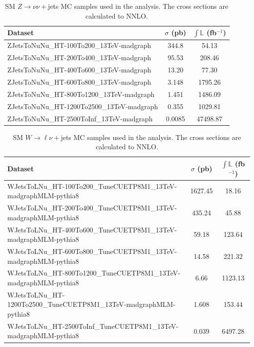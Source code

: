 \begin{table}[hp!]
\centering
\caption{SM $Z\rightarrow\nu\nu+$jets MC samples used in the analysis. The cross sections are calculated to NNLO. }
\label{tab:zjetsMCsamples}
{\footnotesize
\begin{tabular}{lcc}
\hline \hline
Dataset & $\sigma$ (pb) & $\int\mathbb{L}$ (fb$^{-1}$) \\
\hline
ZJetsToNuNu\_HT-100To200\_13TeV-madgraph & 344.8 & 54.13\\
ZJetsToNuNu\_HT-200To400\_13TeV-madgraph & 95.53 & 208.46\\
ZJetsToNuNu\_HT-400To600\_13TeV-madgraph & 13.20 & 77.30\\
ZJetsToNuNu\_HT-600To800\_13TeV-madgraph & 3.148 & 1795.26\\
ZJetsToNuNu\_HT-800To1200\_13TeV-madgraph & 1.451 & 1486.09\\
ZJetsToNuNu\_HT-1200To2500\_13TeV-madgraph & 0.355 & 1029.81\\
ZJetsToNuNu\_HT-2500ToInf\_13TeV-madgraph & 0.0085 & 47498.87\\
\hline \hline
\end{tabular}
}
\end{table}
\begin{table}[hp!]
\centering
\caption{SM $W\rightarrow\ell\nu+$jets MC samples used in the analysis. The cross sections are calculated to NNLO.}
\label{tab:wjetsMCsamples}
{\footnotesize
\begin{tabular}{lcc}
\hline \hline
Dataset & $\sigma$ (pb) & $\int\mathbb{L}$ (fb$^{-1}$) \\
\hline
WJetsToLNu\_HT-100To200\_TuneCUETP8M1\_13TeV-madgraphMLM-pythia8 & 1627.45 & 18.16\\
WJetsToLNu\_HT-200To400\_TuneCUETP8M1\_13TeV-madgraphMLM-pythia8 & 435.24 & 45.88\\
WJetsToLNu\_HT-400To600\_TuneCUETP8M1\_13TeV-madgraphMLM-pythia8 & 59.18 & 123.64\\
WJetsToLNu\_HT-600To800\_TuneCUETP8M1\_13TeV-madgraphMLM-pythia8 & 14.58 & 221.32\\
WJetsToLNu\_HT-800To1200\_TuneCUETP8M1\_13TeV-madgraphMLM-pythia8 & 6.66 & 1123.13\\
WJetsToLNu\_HT-1200To2500\_TuneCUETP8M1\_13TeV-madgraphMLM-pythia8 & 1.608 & 153.44\\
WJetsToLNu\_HT-2500ToInf\_TuneCUETP8M1\_13TeV-madgraphMLM-pythia8 & 0.039 & 6497.28\\
\hline \hline
\end{tabular}
}
\end{table}


